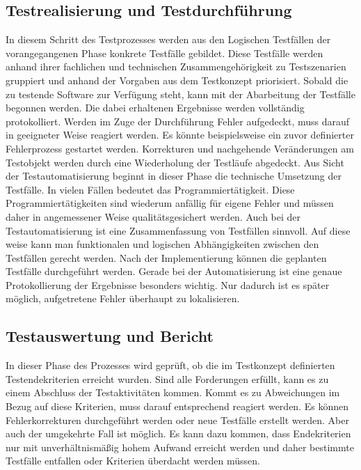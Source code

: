 \subsection{Testrealisierung und Testdurchführung}
\label{subsec:testrealisierung_und_durchführung}
In diesem Schritt des Testprozesses werden aus den Logischen Testfällen der vorangegangenen Phase konkrete Testfälle gebildet.
Diese Testfälle werden anhand ihrer fachlichen und technischen Zusammengehörigkeit zu Testszenarien gruppiert und anhand der Vorgaben aus dem Testkonzept priorisiert.
Sobald die zu testende Software zur Verfügung steht, kann mit der Abarbeitung der Testfälle begonnen werden. Die dabei erhaltenen Ergebnisse werden vollständig protokolliert. Werden im Zuge der Durchführung Fehler aufgedeckt, muss darauf in geeigneter Weise reagiert werden. Es könnte beispielsweise ein zuvor definierter Fehlerprozess gestartet werden.
Korrekturen und nachgehende Veränderungen am Testobjekt werden durch eine Wiederholung der Testläufe abgedeckt.
Aus Sicht der Testautomatisierung beginnt in dieser Phase die technische Umsetzung der Testfälle.
In vielen Fällen bedeutet das Programmiertätigkeit. Diese Programmiertätigkeiten sind wiederum anfällig für eigene Fehler und müssen daher in angemessener Weise qualitätsgesichert werden. Auch bei der Testautomatisierung ist eine Zusammenfassung von Testfällen sinnvoll. Auf diese weise kann man funktionalen und logischen Abhängigkeiten zwischen den Testfällen gerecht werden.
Nach der Implementierung können die geplanten Testfälle durchgeführt werden.
Gerade bei der Automatisierung ist eine genaue Protokollierung der Ergebnisse besonders wichtig.
Nur dadurch ist es später möglich, aufgetretene Fehler überhaupt zu lokalisieren.


\subsection{Testauswertung und Bericht}
\label{subsec:testauswertung_und_bericht}
In dieser Phase des Prozesses wird geprüft, ob die im Testkonzept definierten Testendekriterien erreicht wurden. Sind alle Forderungen erfüllt, kann es zu einem Abschluss der Testaktivitäten kommen. Kommt es zu Abweichungen im Bezug auf diese Kriterien, muss darauf entsprechend reagiert werden. Es können Fehlerkorrekturen durchgeführt werden oder neue Testfälle erstellt werden. Aber auch der umgekehrte Fall ist möglich. Es kann dazu kommen, dass Endekriterien nur mit unverhältnismäßig hohem Aufwand erreicht werden 
und daher bestimmte Testfälle entfallen oder Kriterien überdacht werden müssen.

